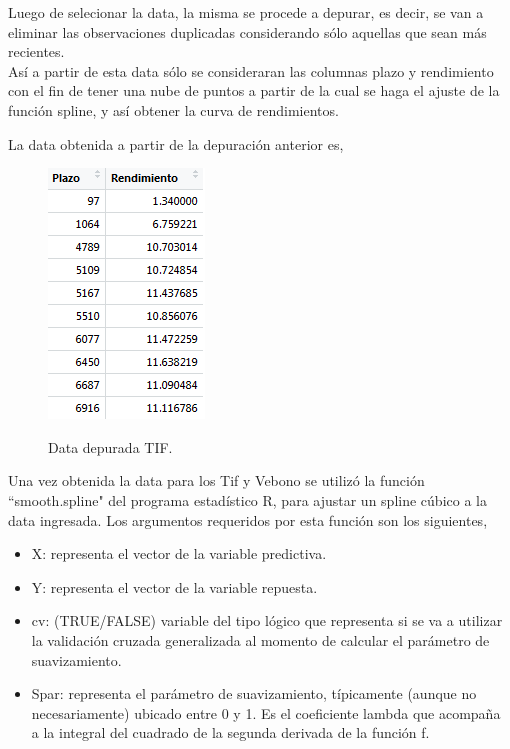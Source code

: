 \hspace{0.4cm} Luego de selecionar la data, la misma se procede a depurar, es decir, se van a eliminar las observaciones duplicadas considerando s\'olo aquellas que sean m\'as recientes. \\


\hspace{0.4cm}As\'i a partir de esta data s\'olo se consideraran las columnas plazo y rendimiento con el fin de tener una nube de puntos a partir de la cual se haga el ajuste de la funci\'on spline, y as\'i obtener la curva de rendimientos.


\hspace{0.4cm} La data obtenida a partir de la depuraci\'on anterior es,

\begin{figure}[h]
    {\includegraphics{images/cand.png}}
\caption{Data depurada TIF.}
\label{fig91}
\end{figure}



\hspace{0.4cm} Una vez obtenida la data para los Tif y Vebono se utiliz\'o la funci\'on ``smooth.spline" del programa estad\'istico R, para ajustar un spline c\'ubico a la data ingresada. Los argumentos requeridos por esta funci\'on son los siguientes,

\begin{itemize}
  \item X: representa el vector de la variable predictiva.
  \item Y: representa el vector de la variable repuesta.
  \item cv: (TRUE/FALSE) variable del tipo l\'ogico que representa si se va a utilizar la validaci\'on cruzada generalizada al momento de calcular el par\'ametro de suavizamiento.
  \item Spar: representa el par\'ametro de suavizamiento, t\'ipicamente (aunque no necesariamente) ubicado entre 0 y 1. Es el coeficiente lambda que acompa\~na a la integral del cuadrado de la segunda derivada de la funci\'on f.
\end{itemize}

